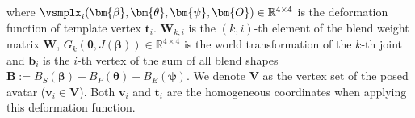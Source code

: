 where $\vsmplx_i(\bm{\beta},\bm{\theta},\bm{\psi},\bm{O}) \in \mathbb{R}^{4\times 4}$ is the deformation function of template vertex $\bm{t}_i$.   
$\bm{W}_{k,i}$ is the $(k,i)$-th element of the blend weight matrix $\bm{W}$, $G_k(\bm{\theta},J(\bm{\beta}))\in\mathbb{R}^{4\times 4}$ is the world transformation of the $k$-th joint and $\bm{b}_i$ is the $i$-th vertex of the sum of all blend shapes $\bm{B} := B_S(\bm{\beta})+B_P(\bm{\theta})+B_E(\bm{\psi})$. We denote $\bm{V}$ as the vertex set of the posed avatar ($\bm{v}_i\in\bm{V}$). Both $\bm{v}_i$ and $\bm{t}_i$ are the homogeneous coordinates when applying this deformation function. 










